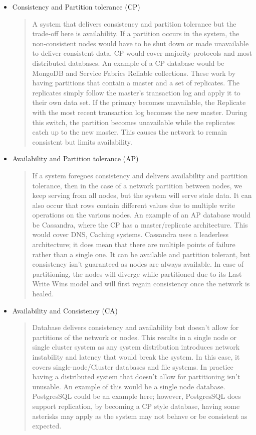 \documentclass[a4paper,10pt,titlepage]{report}
\begin{document}
\begin{itemize}
    \item Consistency and Partition tolerance (CP) \\ 
    \begin{quote}
         A system that delivers consistency and partition tolerance but the trade-off here is availability. If a partition occurs in the system, the non-consistent nodes would have to be shut down or made unavailable to deliver consistent data. CP would cover majority protocols and most distributed databases. An example of a CP database would be MongoDB and Service Fabrics Reliable collections. These work by having partitions that contain a master and a set of replicates. The replicates simply follow the master's transaction log and apply it to their own data set. If the primary becomes unavailable, the Replicate with the most recent transaction log becomes the new master. During this switch, the partition becomes unavailable while the replicates catch up to the new master. This causes the network to remain consistent but limits availability.
    \end{quote}


    \item Availability and Partition tolerance (AP) \\ 
    \begin{quote}
    If a system foregoes consistency and delivers availability and partition tolerance, then in the case of a network partition between nodes, we keep serving from all nodes, but the system will serve stale data. It can also occur that rows contain different values due to multiple write operations on the various nodes. An example of an AP database would be Cassandra, where the CP has a master/replicate architecture. This would cover DNS, Caching systems. Cassandra uses a leaderless architecture; it does mean that there are multiple points of failure rather than a single one. It can be available and partition tolerant, but consistency isn't guaranteed as nodes are always available. In case of partitioning, the nodes will diverge while partitioned due to its Last Write Wins model and will first regain consistency once the network is healed. 
    \end{quote}

    \item Availability and Consistency (CA) \\ 
    \begin{quote}Database delivers consistency and availability but doesn't allow for partitions of the network or nodes. This results in a single node or single cluster system as any system distribution introduces network instability and latency that would break the system. In this case, it covers single-node/Cluster databases and file systems. In practice having a distributed system that doesn't allow for partitioning isn't unusable. An example of this would be a single node database. PostgresSQL could be an example here; however, PostgresSQL does support replication, by becoming a CP style database, having some asterisks may apply as the system may not behave or be consistent\cite{aphyrpostgres} as expected. \end{quote}
\end{itemize}
\end{document}
